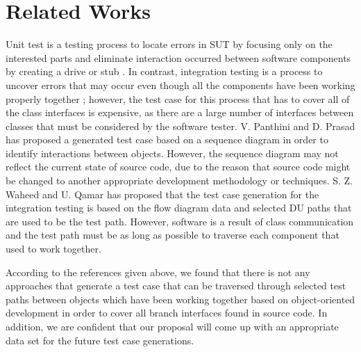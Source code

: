 \section{Related Works}

Unit test is a testing process to locate errors in SUT by focusing 
only on the interested parts and eliminate interaction occurred 
between software components by creating a drive or stub 
\cite{Jorgensen2013}. In contrast, integration testing is a process 
to uncover errors that may occur even though all the components 
have been working properly together \cite{Jalote:1997:IAS:549018}; however, the test case 
for this process that has to cover all of the class interfaces 
is expensive, as there are a large number of interfaces between 
classes that must be considered by the software tester. 
V. Panthini and D. Prasad \cite{4425952} has proposed a generated test case 
based on a sequence diagram in order to identify interactions 
between objects. However, the sequence diagram may not reflect 
the current state of source code, due to the reason 
that source code might be changed to another appropriate development 
methodology or techniques. S. Z. Waheed and U. Qamar \cite{7339088} 
has proposed that the test case generation for the integration testing 
is based on the flow diagram data and selected DU 
paths that are used to be the test path.  However, software 
is a result of class communication and the test path 
must be as long as possible to traverse each component 
that used to work together.

According to the references given above, we found that there 
is not any approaches that generate a test case that can be traversed 
through selected test paths between objects which have been working 
together based on object-oriented development in order to cover 
all branch interfaces found in source code. In addition, 
we are confident that our proposal will come up with an appropriate 
data set for the future test case generations.
